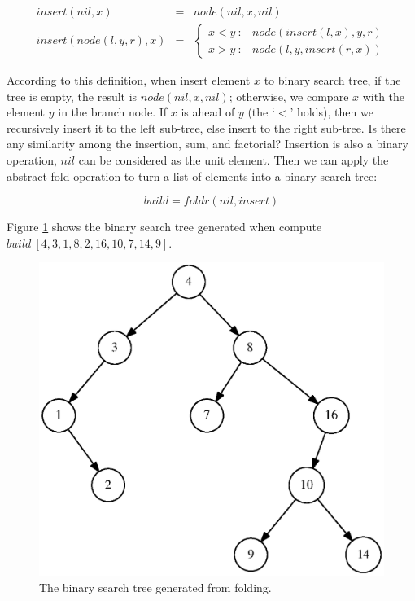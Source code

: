 \documentclass{article}
\begin{document}
\[
\begin{array}{rcl}
  insert(nil, x) & = & node(nil, x, nil) \\
  insert(node(l, y, r), x) & = & \left.
  \begin{cases}
  x < y\ : & node(insert(l, x), y, r) \\
  x > y\ : & node(l, y, insert(r, x))
  \end{cases} \right.
\end{array}
\label{eq:BST-insert}
\]

According to this definition, when insert element $x$ to binary search tree, if the tree is empty, the result is $node(nil, x, nil)$; otherwise, we compare $x$ with the element $y$ in the branch node. If $x$ is ahead of $y$ (the `$<$' holds), then we recursively insert it to the left sub-tree, else insert to the right sub-tree. Is there any similarity among the insertion, sum, and factorial? Insertion is also a binary operation, $nil$ can be considered as the unit element. Then we can apply the abstract fold operation to turn a list of elements into a binary search tree:

\[
build = foldr(nil, insert)
\]

Figure \ref{fig:bst-example} shows the binary search tree generated when compute $build\ [4, 3, 1, 8, 2, 16, 10, 7, 14, 9]$.

\begin{figure}[htbp]
  \centering
  \includegraphics[scale=0.5]{img/bst-example.ps}
  \caption{The binary search tree generated from folding.}
  \label{fig:bst-example}
\end{figure}
\end{document}
